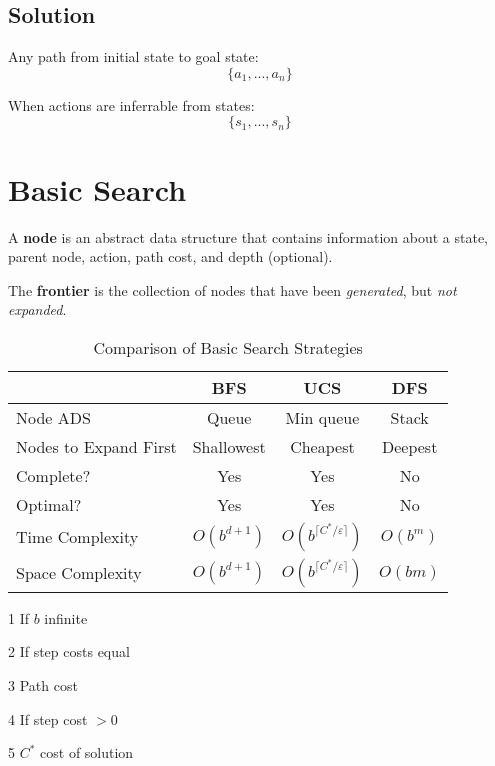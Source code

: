 \documentclass{article}
\begin{document}
    \subsection{Solution}

    Any path from initial state to goal state: $$\{a_1, ..., a_n\}$$
    
    When actions are inferrable from states: $$\{s_1, ..., s_n\}$$

    \section{Basic Search}

    A \textbf{node} is an abstract data structure that contains information about a state, parent node, action, path cost, and depth (optional).

    The \textbf{frontier} is the collection of nodes that have been \textit{generated}, but \textit{not expanded}.

    \begin{table}[h]
        \caption{Comparison of Basic Search Strategies}
        \label{tab:basic-search-comparison}
        \centering
        \begin{threeparttable}
            \begin{tabular}{lccc}
                \toprule
                & BFS & UCS & DFS \\
                \midrule
                Node ADS & Queue & Min queue\tnote{3} & Stack \\
                Nodes to Expand First & Shallowest & Cheapest & Deepest \\
                Complete? & Yes\tnote{1} & Yes\tnote{4} & No \\
                Optimal? & Yes\tnote{2} & Yes & No \\
                Time Complexity & $O(b^{d + 1})$ & $O(b^{\lceil C^*/\varepsilon\rceil})$\tnote{5} & $O(b^m)$ \\
                Space Complexity & $O(b^{d + 1})$ & $O(b^{\lceil C^*/\varepsilon\rceil})$ & $O(bm)$ \\
                \bottomrule
            \end{tabular}
            \begin{tablenotes}
                \item[1] If $b$ infinite
                \item[2] If step costs equal
                \item[3] Path cost
                \item[4] If step cost $>0$
                \item[5] $C^*$ cost of solution
            \end{tablenotes}
        \end{threeparttable}
    \end{table}
\end{document}
